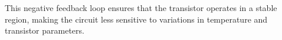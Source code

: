 This negative feedback loop ensures that the transistor operates in a stable region, making the circuit less sensitive to variations in temperature and transistor parameters.

